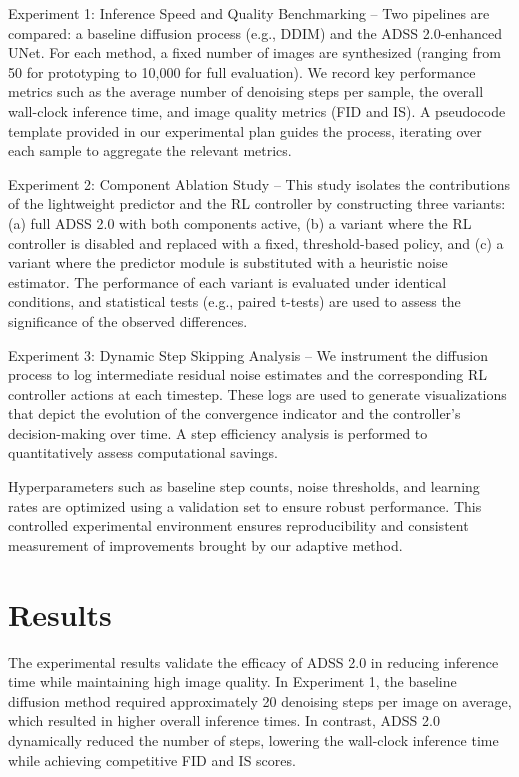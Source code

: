 \documentclass{article} %
\begin{document}
Experiment 1: Inference Speed and Quality Benchmarking -- Two pipelines are compared: a baseline diffusion process (e.g., DDIM) and the ADSS 2.0-enhanced UNet. For each method, a fixed number of images are synthesized (ranging from 50 for prototyping to 10,000 for full evaluation). We record key performance metrics such as the average number of denoising steps per sample, the overall wall-clock inference time, and image quality metrics (FID and IS). A pseudocode template provided in our experimental plan guides the process, iterating over each sample to aggregate the relevant metrics.

Experiment 2: Component Ablation Study -- This study isolates the contributions of the lightweight predictor and the RL controller by constructing three variants: (a) full ADSS 2.0 with both components active, (b) a variant where the RL controller is disabled and replaced with a fixed, threshold-based policy, and (c) a variant where the predictor module is substituted with a heuristic noise estimator. The performance of each variant is evaluated under identical conditions, and statistical tests (e.g., paired t-tests) are used to assess the significance of the observed differences.

Experiment 3: Dynamic Step Skipping Analysis -- We instrument the diffusion process to log intermediate residual noise estimates and the corresponding RL controller actions at each timestep. These logs are used to generate visualizations that depict the evolution of the convergence indicator and the controller’s decision-making over time. A step efficiency analysis is performed to quantitatively assess computational savings.

Hyperparameters such as baseline step counts, noise thresholds, and learning rates are optimized using a validation set to ensure robust performance. This controlled experimental environment ensures reproducibility and consistent measurement of improvements brought by our adaptive method.

\section{Results}
\label{sec:results}
The experimental results validate the efficacy of ADSS 2.0 in reducing inference time while maintaining high image quality. In Experiment 1, the baseline diffusion method required approximately 20 denoising steps per image on average, which resulted in higher overall inference times. In contrast, ADSS 2.0 dynamically reduced the number of steps, lowering the wall-clock inference time while achieving competitive FID and IS scores. 
\end{document}
